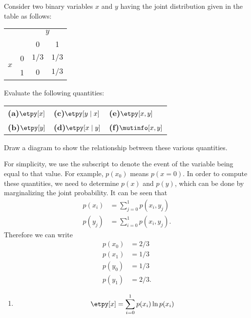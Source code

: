 \begin{question}{1.39}
	Consider two binary variables $x$ and $y$ having the joint distribution given in the table as follows:
	\begin{table*}[h]
		\centering
		\begin{tabular}{cc|cc}
			\multicolumn{2}{c}{} & \multicolumn{2}{c}{$y$}\\
			&  & 0 & 1\\ \cline{2-4}
			\multirow{2}{*}{$x$} & 0 & $1/3$ & $1/3$\\
			& 1 & $0$ & $1/3$
		\end{tabular}
	\end{table*}

	\noindent Evaluate the following quantities:
	
	\begin{table*}[h]
		\centering
		\begin{tabular}{l@{\hskip 0.3\linewidth}l@{\hskip 0.3\linewidth}l}
			{\textbf{(a)}$\etpy[x]$} & {\textbf{(c)}$\etpy[y \mid x]$} & {\textbf{(e)}$\etpy[x, y]$}\\ [0.5em]
			
			{\textbf{(b)}$\etpy[y]$} & {\textbf{(d)}$\etpy[x \mid y]$} & {\textbf{(f)}$\mutinfo[x, y]$}
		\end{tabular}
	\end{table*}

	\noindent Draw a diagram to show the relationship between these various quantities.
\end{question}

\begin{answer}{}
	For simplicity, we use the subscript to denote the event of the variable being equal to that value. For example, $p(x_0)$ means $p(x = 0)$. In order to compute these quantities, we need to determine $p(x)$ and $p(y)$, which can be done by marginalizing the joint probability. It can be seen that
	\begin{align}
		p(x_i) &= \sum_{j = 0}^{1} p(x_i, y_j)\\
		p(y_j) &= \sum_{i = 0}^{1} p(x_i, y_j).
	\end{align}
	Therefore we can write
	\begin{align}
		p(x_0) &= 2/3\\
		p(x_1) &= 1/3\\
		p(y_0) &= 1/3\\
		p(y_1) &= 2/3.
	\end{align}
	\begin{enumerate}[label = {\bf (\alph*)}]
		\item \begin{align}
			\etpy[x] = \sum_{i = 0}^{1} p(x_i) \ln p(x_i)
		\end{align}
	\end{enumerate}
\end{answer}